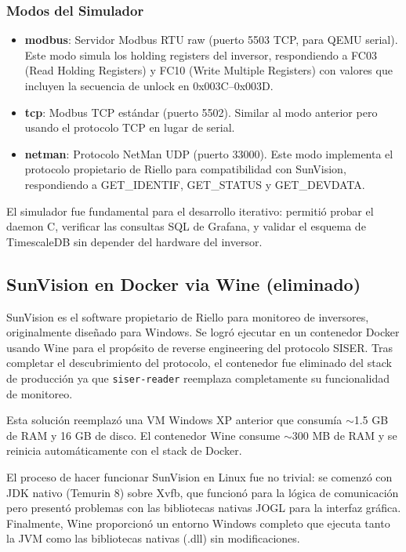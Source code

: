 \documentclass[12pt,a4paper]{article}
\begin{document}
\subsubsection{Modos del Simulador}

\begin{itemize}
    \item \textbf{modbus}: Servidor Modbus RTU raw (puerto 5503 TCP, para QEMU serial). Este modo simula los holding registers del inversor, respondiendo a FC03 (Read Holding Registers) y FC10 (Write Multiple Registers) con valores que incluyen la secuencia de unlock en 0x003C--0x003D.
    \item \textbf{tcp}: Modbus TCP est\'andar (puerto 5502). Similar al modo anterior pero usando el protocolo TCP en lugar de serial.
    \item \textbf{netman}: Protocolo NetMan UDP (puerto 33000). Este modo implementa el protocolo propietario de Riello para compatibilidad con SunVision, respondiendo a GET\_IDENTIF, GET\_STATUS y GET\_DEVDATA.
\end{itemize}

El simulador fue fundamental para el desarrollo iterativo: permiti\'o probar el daemon C, verificar las consultas SQL de Grafana, y validar el esquema de TimescaleDB sin depender del hardware del inversor.

\subsection{SunVision en Docker via Wine (eliminado)}

SunVision es el software propietario de Riello para monitoreo de inversores, originalmente dise\~nado para Windows. Se logr\'o ejecutar en un contenedor Docker usando Wine para el prop\'osito de reverse engineering del protocolo SISER. Tras completar el descubrimiento del protocolo, el contenedor fue eliminado del stack de producci\'on ya que \texttt{siser-reader} reemplaza completamente su funcionalidad de monitoreo.

Esta soluci\'on reemplaz\'o una VM Windows XP anterior que consum\'ia $\sim$1.5 GB de RAM y 16 GB de disco. El contenedor Wine consume $\sim$300 MB de RAM y se reinicia autom\'aticamente con el stack de Docker.

El proceso de hacer funcionar SunVision en Linux fue no trivial: se comenz\'o con JDK nativo (Temurin 8) sobre Xvfb, que funcion\'o para la l\'ogica de comunicaci\'on pero present\'o problemas con las bibliotecas nativas JOGL para la interfaz gr\'afica. Finalmente, Wine proporcion\'o un entorno Windows completo que ejecuta tanto la JVM como las bibliotecas nativas (.dll) sin modificaciones.
\end{document}
